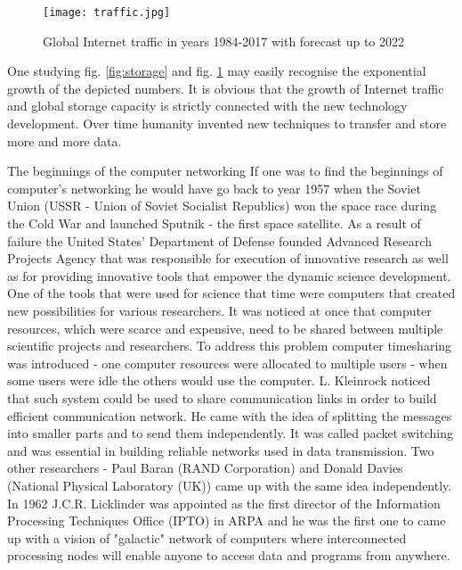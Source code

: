\documentclass[magisterska,en]{pracamgr}
\begin{document}
\begin{figure}[h]
    \centering
    \texttt{[image: traffic.jpg]}
    \caption{Global Internet traffic in years 1984-2017 with forecast up to 2022}
    \label{fig:traffic}
\end{figure}

One studying fig. \ref{fig:storage} and fig. \ref{fig:traffic} may easily recognise the exponential growth of the depicted numbers. It is obvious that the growth of Internet traffic and global storage capacity is strictly connected with the new technology development. Over time humanity invented new techniques to transfer and store more and more data.


\newpage
The beginnings of the computer networking
If one was to find the beginnings of computer's networking he would have go back to year 1957 when the Soviet Union (USSR - Union of Soviet Socialist Republics) won the space race during the Cold War and launched Sputnik - the first space satellite. As a result of failure the United States' Department of Defense founded Advanced Research Projects Agency that was responsible for execution of innovative research as well as for providing innovative tools that empower the dynamic science development.\cite{Internet_History_article} One of the tools that were used for science that time were computers that created new possibilities for various researchers. It was noticed at once that computer resources, which were scarce and expensive, need to be shared between multiple scientific projects and researchers. To address this problem computer timesharing was introduced - one computer resources were allocated to multiple users - when some users were idle the others would use the computer. L. Kleinrock noticed that such system could be used to share communication links in order to build efficient communication network. He came with the idea of splitting the messages into smaller parts and to send them independently. It was called packet switching and was essential in building reliable networks used in data transmission. Two other researchers - Paul Baran (RAND Corporation) and Donald Davies (National Physical Laboratory (UK)) came up with the same idea independently.
In 1962 J.C.R. Licklinder was appointed as the first director of the Information Processing Techniques Office (IPTO) in ARPA and he was the first one to came up with a vision of "galactic" network of computers where interconnected processing nodes will enable anyone to access data and programs from anywhere. \cite{Internet_History_article}
\end{document}
